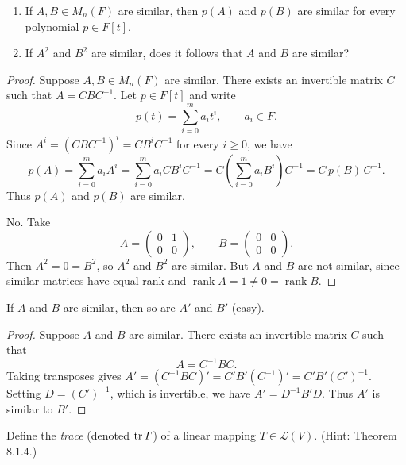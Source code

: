\begin{tcolorbox}[title=Problem 3, breakable]
    \begin{enumerate}
        \item If $A, B \in M_n(F)$ are similar, then $p(A)$ and $p(B)$ are similar for every polynomial $p \in F[t]$.
        \item If $A^2$ and $B^2$ are similar, does it follows that $A$ and $B$ are similar?
    \end{enumerate}
\end{tcolorbox}

\begin{proof}
    Suppose $A, B \in M_n(F)$ are similar.
    There exists an invertible matrix $C$ such that $A = C B C^{-1}$.
    Let $p \in F[t]$ and write 
    \[p(t) = \sum_{i=0}^{m} a_i t^i, \qquad a_i \in F.\]
    Since $A^i = (C B C^{-1})^i = C B^i C^{-1}$ for every $i \geq 0$, we have
    \[p(A) = \sum_{i=0}^{m} a_i A^i = \sum_{i=0}^{m} a_i C B^i C^{-1} = C \left( \sum_{i=0}^{m} a_i B^i \right) C^{-1} = C\, p(B)\, C^{-1}.\]
    Thus $p(A)$ and $p(B)$ are similar.

    No. Take
    \[A = \begin{pmatrix} 0 & 1 \\ 0 & 0 \end{pmatrix}, \qquad B = \begin{pmatrix} 0 & 0 \\ 0 & 0 \end{pmatrix}.\]
    Then $A^2 = 0 = B^2$, so $A^2$ and $B^2$ are similar. But $A$ and $B$ are not similar, since similar matrices have equal rank and $\operatorname{rank} A = 1 \neq 0 = \operatorname{rank} B$.
\end{proof}
\newpage
\begin{tcolorbox}[title=Problem 4, breakable]
    If $A$ and $B$ are similar, then so are $A'$ and $B'$ (easy).
\end{tcolorbox}

\begin{proof}
    Suppose $A$ and $B$ are similar.
    There exists an invertible matrix $C$ such that 
    \[A = C^{-1} B C.\]
    Taking transposes gives $A' = (C^{-1} B C)' = C' B' (C^{-1})' = C' B' (C')^{-1}$.
    Setting $D = (C')^{-1}$, which is invertible, we have $A' = D^{-1} B' D$.
    Thus $A'$ is similar to $B'$.
\end{proof}

\begin{tcolorbox}[title=Problem 5, breakable]
    Define the \emph{trace} (denoted $\operatorname{tr} T$) of a linear mapping $T \in \mathcal{L}(V)$.
    (Hint: Theorem 8.1.4.)
\end{tcolorbox}

